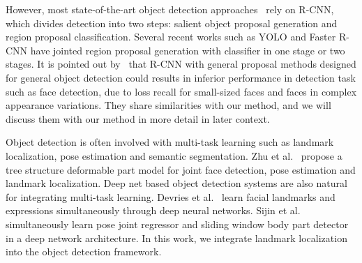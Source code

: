 However, most state-of-the-art object detection approaches~\cite{ouyang2014deepid, li2015convolutional, erhan2014scalable,girshick2015fast,yan2015object} rely on R-CNN, which divides detection into two steps: salient object proposal generation and region proposal classification. Several recent works such as YOLO and Faster R-CNN have jointed region proposal generation with classifier in one stage or two stages. It is pointed out by~\cite{farfade2015multi} that R-CNN with general proposal methods designed for general object detection could results in inferior performance in detection task such as face detection, due to loss recall for small-sized faces and faces in complex appearance variations. They share similarities with our method, and we will discuss them with our method in more detail in later context.  

Object detection is often involved with multi-task learning such as landmark localization, pose estimation and semantic segmentation. Zhu et al.~\cite{zhu2012face} propose a tree structure deformable part model for joint face detection, pose estimation and landmark localization. Deep net based object detection systems are also natural for integrating multi-task learning. Devries et al.~\cite{devries2014multi} learn facial landmarks and expressions simultaneously through deep neural networks. Sijin et al.~\cite{li2014heterogeneous} simultaneously learn pose joint regressor and sliding window body part detector in a deep network architecture. In this work, we integrate landmark localization into the object detection framework. 
